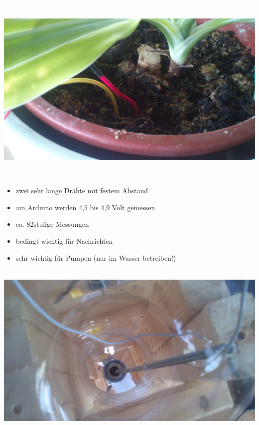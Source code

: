 \documentclass[bigger]{beamer}
\newcommand{\topic}[1]{{\huge{\textcolor{white}{\textbf{#1}}}}}
\begin{document}
\begin{frame}{\topic{Feuchtigkeitssensor}}
\begin{center}\includegraphics[width=\linewidth]{feuchtigkeit.jpg}\end{center}
\end{frame}

\begin{frame}{\topic{Wasserstand}}
	\begin{itemize}
		\item zwei sehr lange Drähte mit festem Abstand
		\item am Arduino werden 4,5 bis 4,9 Volt gemessen
		\item ca. 82stufige Messungen
		\item bedingt wichtig für Nachrichten
		\item sehr wichtig für Pumpen (nur im Wasser betreiben!)
	\end{itemize}
\end{frame}

\begin{frame}{\topic{Wasserstandssensor}}
\includegraphics[width=\linewidth]{wasser.jpg}
\end{frame}
\end{document}
